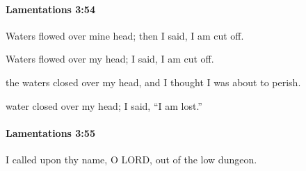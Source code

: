 		\paragraph{Lamentations 3:54} %
			\label{LAMENTATIONS-3-54}

			Waters flowed over mine head; then I said, I am cut off.

			\begin{versebox}
					\item[BHS] 
					\item[LXX] 
					\item[ASV] Waters flowed over my head; I said, I am cut off.
					\item[NIV] the waters closed over my head, and I thought I was about to perish.
					\item[NRSV] water closed over my head; I said, “I am lost.”
			\end{versebox}

		\paragraph{Lamentations 3:55} %
			\label{LAMENTATIONS-3-55}

			I called upon thy name, O LORD, out of the low dungeon.

